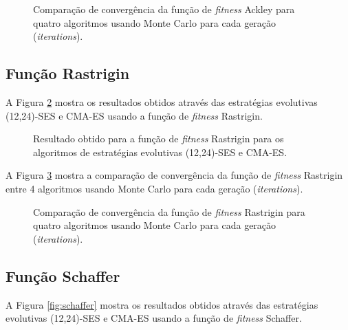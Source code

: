 \documentclass[brazil, 12pt]{article}
\begin{document}
\begin{figure}[H]
	\centering
	\caption{Comparação de convergência da função de \textit{fitness} Ackley para quatro algoritmos usando Monte Carlo para cada geração (\textit{iterations}).}
	\label{fig:ackley_montecarlo}
\end{figure}

\subsection{Função Rastrigin}
A Figura \ref{fig:rastrigin} mostra os resultados obtidos através das estratégias evolutivas (12,24)-SES e CMA-ES usando a função de \textit{fitness} Rastrigin.

\begin{figure}[H]
	\centering
	\caption{Resultado obtido para a função de \textit{fitness} Rastrigin para os algoritmos de estratégias evolutivas (12,24)-SES e CMA-ES.}
	\label{fig:rastrigin}
\end{figure}

A Figura \ref{fig:rastrigin_montecarlo} mostra a comparação de convergência da função de \textit{fitness} Rastrigin entre 4 algoritmos usando Monte Carlo para cada geração (\textit{iterations}).

\begin{figure}[H]
	\centering
	\caption{Comparação de convergência da função de \textit{fitness} Rastrigin para quatro algoritmos usando Monte Carlo para cada geração (\textit{iterations}).}
	\label{fig:rastrigin_montecarlo}
\end{figure}

\subsection{Função Schaffer}
A Figura \ref{fig:schaffer} mostra os resultados obtidos através das estratégias evolutivas (12,24)-SES e CMA-ES usando a função de \textit{fitness} Schaffer.
\end{document}
